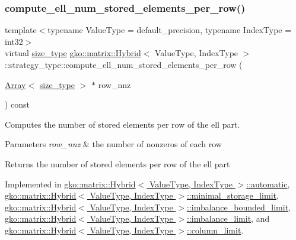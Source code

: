 \subsubsection{\texorpdfstring{compute\+\_\+ell\+\_\+num\+\_\+stored\+\_\+elements\+\_\+per\+\_\+row()}{compute\_ell\_num\_stored\_elements\_per\_row()}}
{\footnotesize\ttfamily template$<$typename Value\+Type = default\+\_\+precision, typename Index\+Type = int32$>$ \\
virtual \hyperlink{namespacegko_a6e5c95df0ae4e47aab2f604a22d98ee7}{size\+\_\+type} \hyperlink{classgko_1_1matrix_1_1Hybrid}{gko\+::matrix\+::\+Hybrid}$<$ Value\+Type, Index\+Type $>$\+::strategy\+\_\+type\+::compute\+\_\+ell\+\_\+num\+\_\+stored\+\_\+elements\+\_\+per\+\_\+row (\begin{DoxyParamCaption}\item[{\hyperlink{classgko_1_1Array}{Array}$<$ \hyperlink{namespacegko_a6e5c95df0ae4e47aab2f604a22d98ee7}{size\+\_\+type} $>$ $\ast$}]{row\+\_\+nnz }\end{DoxyParamCaption}) const\hspace{0.3cm}{\ttfamily [pure virtual]}}



Computes the number of stored elements per row of the ell part. 


\begin{DoxyParams}{Parameters}
{\em row\+\_\+nnz} & the number of nonzeros of each row\\
\hline
\end{DoxyParams}
\begin{DoxyReturn}{Returns}
the number of stored elements per row of the ell part 
\end{DoxyReturn}


Implemented in \hyperlink{classgko_1_1matrix_1_1Hybrid_1_1automatic_a804d556fbcbe8ed754e167f270b16118}{gko\+::matrix\+::\+Hybrid$<$ Value\+Type, Index\+Type $>$\+::automatic}, \hyperlink{classgko_1_1matrix_1_1Hybrid_1_1minimal__storage__limit_a381273c294099363637e40cb536fa63a}{gko\+::matrix\+::\+Hybrid$<$ Value\+Type, Index\+Type $>$\+::minimal\+\_\+storage\+\_\+limit}, \hyperlink{classgko_1_1matrix_1_1Hybrid_1_1imbalance__bounded__limit_ae68c0d740e1424f5cdb3be5919a856b8}{gko\+::matrix\+::\+Hybrid$<$ Value\+Type, Index\+Type $>$\+::imbalance\+\_\+bounded\+\_\+limit}, \hyperlink{classgko_1_1matrix_1_1Hybrid_1_1imbalance__limit_aa95250e2c38d516dbd2fbf5bdfa67e72}{gko\+::matrix\+::\+Hybrid$<$ Value\+Type, Index\+Type $>$\+::imbalance\+\_\+limit}, and \hyperlink{classgko_1_1matrix_1_1Hybrid_1_1column__limit_afb410def66106b711ac094fd31d48aba}{gko\+::matrix\+::\+Hybrid$<$ Value\+Type, Index\+Type $>$\+::column\+\_\+limit}.




